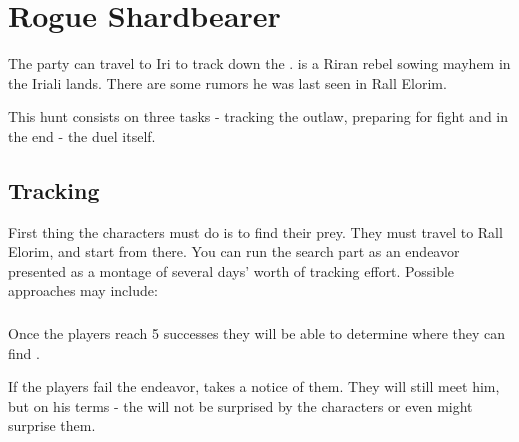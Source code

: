 \section{Rogue Shardbearer}

The party can travel to Iri to track down the \enemyRogueShardbearer{}. \npcRogueShardbearer[s] is a Riran rebel sowing mayhem in the Iriali lands. There are some rumors he was last seen in Rall Elorim.

This hunt consists on three tasks - tracking the outlaw, preparing for fight and in the end - the duel itself.

\subsection{Tracking \npcRogueShardbearer{}}

First thing the characters must do is to find their prey. They must travel to Rall Elorim, and start from there. You can run the search part as an endeavor presented as a montage of several days' worth of tracking effort. Possible approaches may include:




\subsubsection{\pursuitResolveHeader}

Once the players reach 5 successes they will be able to determine where they can find \npcRogueShardbearer{}. 

If the players fail the endeavor, \npcRogueShardbearer{} takes a notice of them. They will still meet him, but on his terms - the \enemyRogueShardbearer{} will not be surprised by the characters or even might surprise them.

